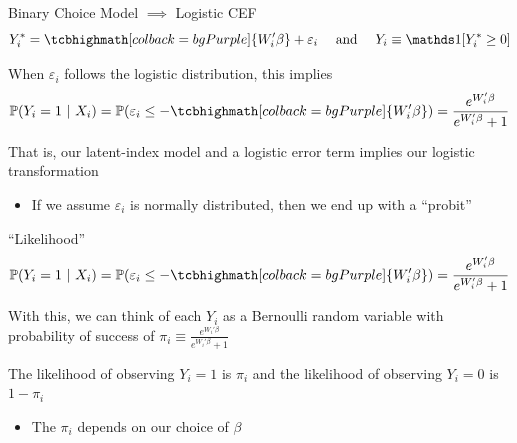 \documentclass[aspectratio=169,t,11pt,table]{beamer}
\begin{document}
\begin{frame}{Binary Choice Model $\implies$ Logistic CEF}
  \vspace*{-\bigskipamount}
  $$
    Y_{i}^* = \tcbhighmath[colback = bgPurple]{W_i' \beta} + \varepsilon_i 
    \quad \text{ and } \quad 
    Y_i \equiv \one{Y_i^* \geq 0}
  $$

  \bigskip
  When $\varepsilon_i$ follows the \alert{logistic distribution}, this implies 
  $$
    \prob{Y_i = 1}{X_i} = 
    \prob{\varepsilon_i \leq - \tcbhighmath[colback = bgPurple]{W_i' \beta}} = 
    \frac{e^{W_i'\beta}}{e^{W_i'\beta} + 1}
  $$

  \pause
  \bigskip
  \bigskip
  That is, our latent-index model and a logistic error term implies our logistic transformation
  \begin{itemize}
    \item If we assume $\varepsilon_i$ is normally distributed, then we end up with a ``probit''
  \end{itemize}
\end{frame}

\begin{frame}{``Likelihood''}
  \vspace*{-\bigskipamount}
  $$
    \prob{Y_i = 1}{X_i} = 
    \prob{\varepsilon_i \leq - \tcbhighmath[colback = bgPurple]{W_i' \beta}} = 
    \frac{e^{W_i'\beta}}{e^{W_i'\beta} + 1}
  $$

  \bigskip
  With this, we can think of each $Y_i$ as a Bernoulli random variable with probability of success of $\pi_i \equiv \frac{e^{W_i'\beta}}{e^{W_i'\beta} + 1}$

  \pause
  \bigskip
  \bigskip
  The \alert{likelihood} of observing $Y_i = 1$ is $\pi_i$ and the \alert{likelihood} of observing $Y_i = 0$ is $1 - \pi_i$
  \begin{itemize}
    \item The $\pi_i$ depends on our choice of $\beta$
  \end{itemize}
\end{frame}
\end{document}
